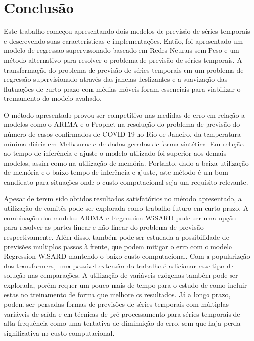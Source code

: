 \chapter{Conclusão}
\label{chap:06}

Este trabalho começou apresentando dois modelos de previsão de séries temporais e descrevendo suas características e implementações. Então, foi apresentado um modelo de regressão supervisionado baseado em Redes Neurais sem Peso e um método alternativo para resolver o problema de previsão de séries temporais. A transformação do problema de previsão de séries temporais em um problema de regressão supervisionado através das janelas deslizantes e a suavização das flutuações de curto prazo com médias móveis foram essenciais para viabilizar o treinamento do modelo avaliado.

O método apresentado provou ser competitivo nas medidas de erro em relação a modelos como o ARIMA e o Prophet na resolução do problema de previsão do número de casos confirmados de COVID-19 no Rio de Janeiro, da temperatura mínima diária em Melbourne e de dados gerados de forma sintética. Em relação ao tempo de inferência e ajuste o modelo utilizado foi superior aos demais modelos, assim como na utilização de memória. Portanto, dado a baixa utilização de memória e o baixo tempo de inferência e ajuste, este método é um bom candidato para situações onde o custo computacional seja um requisito relevante.

Apesar de terem sido obtidos resultados satisfatórios no método apresentado, a utilização de comitês pode ser explorada como trabalho futuro em curto prazo. A combinação dos modelos ARIMA e Regression WiSARD pode ser uma opção para resolver as partes linear e não linear do problema de previsão respectivamente. Além disso, também pode ser estudada a possibilidade de previsões multiplos passos à frente, que podem mitigar o erro com o modelo Regression WiSARD mantendo o baixo custo computacional. Com a popularizção dos transformers, uma possível extensão do trabalho é adicionar esse tipo de solução nas comparações. A utilização de variáveis exógenas também pode ser explorada, porém requer um pouco mais de tempo para o estudo de como incluir estas no treinamento de forma que melhore os resultados. Já a longo prazo, podem ser pensadas formas de previsões de séries temporais com múltiplas variáveis de saída e em técnicas de pré-processamento para séries temporais de alta frequência como uma tentativa de diminuição do erro, sem que haja perda significativa no custo computacional.
